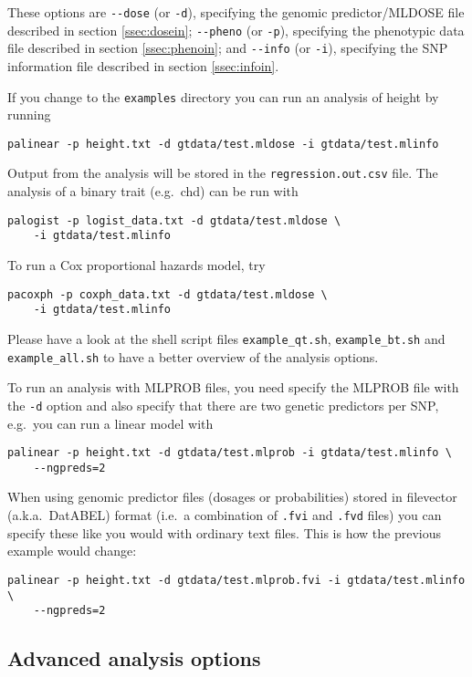 \documentclass[12pt,a4paper]{article}
\begin{document}
These options are \lstinline{--dose} (or \lstinline{-d}), specifying the
genomic predictor/MLDOSE file described in section \ref{ssec:dosein};
\lstinline{--pheno} (or \lstinline{-p}), specifying the phenotypic data file
described in section \ref{ssec:phenoin}; and \lstinline{--info} (or
\lstinline{-i}), specifying the SNP information file described in section
\ref{ssec:infoin}.

If you change to the \texttt{examples} directory you can run
an analysis of height by running
\begin{verbatim}
palinear -p height.txt -d gtdata/test.mldose -i gtdata/test.mlinfo
\end{verbatim}
Output from the analysis will be stored in the
\texttt{regression.out.csv} file.
The analysis of a binary trait (e.g.~chd) can be run with
\begin{verbatim}
palogist -p logist_data.txt -d gtdata/test.mldose \
    -i gtdata/test.mlinfo
\end{verbatim}
To run a Cox proportional hazards model, try
\begin{verbatim}
pacoxph -p coxph_data.txt -d gtdata/test.mldose \
    -i gtdata/test.mlinfo
\end{verbatim}

Please have a look at the shell script files \texttt{example\_qt.sh},
\texttt{example\_bt.sh} and \texttt{example\_all.sh} to have
a better overview of the analysis options.

To run an analysis with MLPROB files, you need specify the MLPROB file
with the \lstinline{-d} option and also specify that there are two
genetic predictors per SNP, e.g.~you can run a linear model with
\begin{verbatim}
palinear -p height.txt -d gtdata/test.mlprob -i gtdata/test.mlinfo \
    --ngpreds=2
\end{verbatim}

When using genomic predictor files (dosages or probabilities) stored
in filevector (a.k.a.~DatABEL) format (i.e.~a combination of
\texttt{.fvi} and \texttt{.fvd} files) you can specify these like you
would with ordinary text files. This is how the previous example would
change:
\begin{verbatim}
palinear -p height.txt -d gtdata/test.mlprob.fvi -i gtdata/test.mlinfo \
    --ngpreds=2
\end{verbatim}

\subsection{Advanced analysis options}
\end{document}

